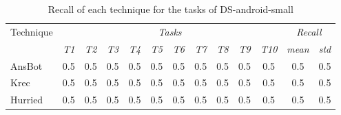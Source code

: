 \begin{table}[H]
\centering    
\begin{scriptsize}
\begin{threeparttable}
\begin{tabular}{lcccccccccccc}

\hline


\multirow{2.5}{*}{Technique}
& \multicolumn{10}{c}{\textit{Tasks}} 
& \multicolumn{2}{c}{\textit{Recall}}
\\  \cmidrule(l){2-11} \cmidrule(l){12-13} 



&
\textit{T1} & \textit{T2} & \textit{T3} & \textit{T4} & \textit{T5}
& \textit{T6} & \textit{T7} & \textit{T8} & \textit{T9} & \textit{T10}
& \textit{mean}
& \textit{std}
\\


\hline
\hline

\acs{AnsBot} 
& 0.5 & 0.5 & 0.5 & 0.5 & 0.5
& 0.5 & 0.5 & 0.5 & 0.5 & 0.5
& 0.5 %
& 0.5 %
\\

\acs{Krec} 
& 0.5 & 0.5 & 0.5 & 0.5 & 0.5
& 0.5 & 0.5 & 0.5 & 0.5 & 0.5
& 0.5 %
& 0.5 %
\\

\acs{Hurried} 
& 0.5 & 0.5 & 0.5 & 0.5 & 0.5
& 0.5 & 0.5 & 0.5 & 0.5 & 0.5
& 0.5 %
& 0.5 %
\\

\hline

\end{tabular}
\end{threeparttable}
\end{scriptsize}
\caption{Recall of each technique for the tasks of \acs{DS-android-small}}
\label{tbl:ds-small-results-recall}
\end{table}

    